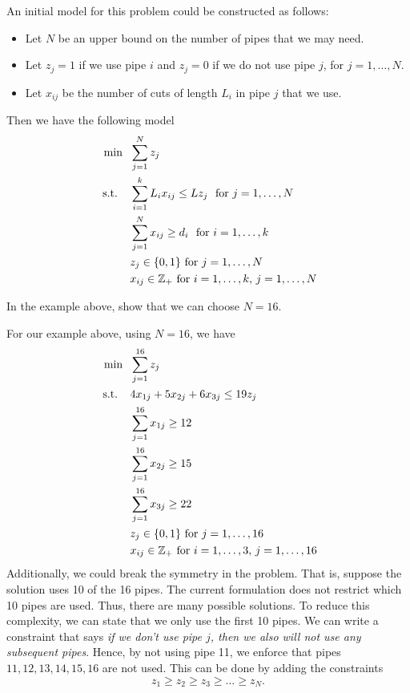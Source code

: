 \documentclass[../open-optimization/open-optimization.tex]{subfiles}
\begin{document}
An initial model for this problem could be constructed as follows:  
\begin{itemize}
\item Let $N$ be an upper bound on the number of pipes that we may need.
\item Let $z_j = 1$ if we use pipe $i$ and $z_j = 0$ if we do not use pipe $j$, for $j=1, \dots, N$.
\item Let $x_{ij}$ be the number of cuts of length $L_i$ in pipe $j$ that we use.
\end{itemize}
Then we have the following model
\begin{equation}
\begin{split}
\min\ \  & \sum_{j=1}^N z_j\\
\text{ s.t. } \ \  & \sum_{i=1}^k  L_i x_{ij} \leq Lz_j \ \text{ for } j=1,\dots, N\\
& \sum_{j=1}^N x_{ij} \geq d_i \ \text{ for } i=1, \dots, k\\
& z_j \in \{0,1\} \text{ for } j=1, \dots, N\\
& x_{ij} \in {\mathbb{Z}}_+ \text{ for } i=1, \dots, k,\, j=1, \dots, N
\end{split}
\end{equation}
\begin{exercise}
In the example above, show that we can choose $N=16$.
\end{exercise}
For our example above, using $N=16$, we have
\begin{equation}
\begin{split}
\min\ \  & \sum_{j=1}^{16} z_j\\
\text{ s.t. } \ \  &  4 x_{1j} + 5 x_{2j} + 6 x_{3j} \leq 19 z_j\\
& \sum_{j=1}^{16} x_{1j} \geq 12\\
& \sum_{j=1}^{16} x_{2j} \geq 15\\
& \sum_{j=1}^{16} x_{3j} \geq 22\\
& z_j \in \{0,1\} \text{ for } j=1, \dots, 16\\
& x_{ij} \in {\mathbb{Z}}_+ \text{ for } i=1, \dots, 3,\, j=1, \dots, 16
\end{split}
\end{equation}
Additionally, we could break the symmetry in the problem.  That is, suppose the solution uses 10 of the 16 pipes.  The current formulation does not restrict which 10 pipes are used.  Thus, there are many possible solutions.  To reduce this complexity, we can state that we only use the first 10 pipes.  We can write a constraint that says \emph{if we don't use pipe $j$, then we also will not use any subsequent pipes}.  Hence, by not using pipe 11, we enforce that pipes $11, 12, 13, 14,15,16$ are not used.  This can be done by adding the constraints
\begin{equation}
z_1 \geq z_2 \geq z_3 \geq \dots \geq z_N.
\end{equation}
\end{document}
